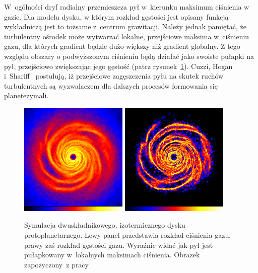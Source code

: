 \par W~ogólności dryf radialny przemieszcza pył w~kierunku maksimum ciśnienia w
gazie. Dla modelu dysku, w którym rozkład gęstości jest opisany funkcją
wykładniczą jest to tożsame z~centrum grawitacji. Należy jednak pamiętać, że
turbulentny ośrodek może wytwarzać lokalne, przejściowe maksima w~ciśnieniu
gazu, dla których gradient będzie dużo większy niż gradient globalny. Z tego
względu obszary o podwyższonym ciśnieniu będą działać jako swoiste pułapki na
pył, przejściowo zwiększając jego gęstość (patrz rysunek~\ref{fig:chap1_trap}).
Cuzzi, Hogan i~Shariff~\citep{CHS08} postulują, iż przejściowe zagęszczenia pyłu
na skutek ruchów turbulentnych są wyzwalaczem dla dalszych procesów formowania
się planetezymali.
%
\begin{figure}
   \centering
   \includegraphics[width=0.46\textwidth]{figures/chap1_gasdisk.png}
   \includegraphics[width=0.46\textwidth]{figures/chap1_dustdisk.png}
   \caption{Symulacja dwuskładnikowego, izotermicznego dysku
      pro\-to\-pla\-ne\-tar\-ne\-go.
      Lewy panel przedstawia rozkład ciśnienia gazu, prawy zaś rozkład gęstości
      gazu. Wy\-raź\-nie widać jak pył jest pułapkowany w~lokalnych maksimach
      ciśnienia. Obrazek za\-po\-ży\-czo\-ny~z pracy~\cite{RLP2006}}
   \label{fig:chap1_trap}
\end{figure}

